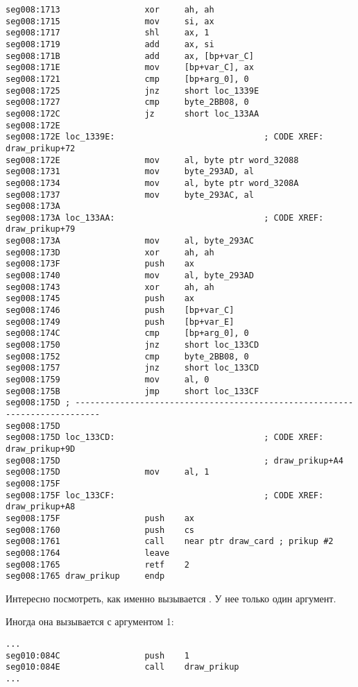 \begin{lstlisting}
seg008:1713                 xor     ah, ah
seg008:1715                 mov     si, ax
seg008:1717                 shl     ax, 1
seg008:1719                 add     ax, si
seg008:171B                 add     ax, [bp+var_C]
seg008:171E                 mov     [bp+var_C], ax
seg008:1721                 cmp     [bp+arg_0], 0
seg008:1725                 jnz     short loc_1339E
seg008:1727                 cmp     byte_2BB08, 0
seg008:172C                 jz      short loc_133AA
seg008:172E
seg008:172E loc_1339E:                              ; CODE XREF: draw_prikup+72
seg008:172E                 mov     al, byte ptr word_32088
seg008:1731                 mov     byte_293AD, al
seg008:1734                 mov     al, byte ptr word_3208A
seg008:1737                 mov     byte_293AC, al
seg008:173A
seg008:173A loc_133AA:                              ; CODE XREF: draw_prikup+79
seg008:173A                 mov     al, byte_293AC
seg008:173D                 xor     ah, ah
seg008:173F                 push    ax
seg008:1740                 mov     al, byte_293AD
seg008:1743                 xor     ah, ah
seg008:1745                 push    ax
seg008:1746                 push    [bp+var_C]
seg008:1749                 push    [bp+var_E]
seg008:174C                 cmp     [bp+arg_0], 0
seg008:1750                 jnz     short loc_133CD
seg008:1752                 cmp     byte_2BB08, 0
seg008:1757                 jnz     short loc_133CD
seg008:1759                 mov     al, 0
seg008:175B                 jmp     short loc_133CF
seg008:175D ; ---------------------------------------------------------------------------
seg008:175D
seg008:175D loc_133CD:                              ; CODE XREF: draw_prikup+9D
seg008:175D                                         ; draw_prikup+A4
seg008:175D                 mov     al, 1
seg008:175F
seg008:175F loc_133CF:                              ; CODE XREF: draw_prikup+A8
seg008:175F                 push    ax
seg008:1760                 push    cs
seg008:1761                 call    near ptr draw_card ; prikup #2
seg008:1764                 leave
seg008:1765                 retf    2
seg008:1765 draw_prikup     endp
\end{lstlisting}

Интересно посмотреть, как именно вызывается . У нее только один аргумент.

Иногда она вызывается с аргументом 1:

\begin{lstlisting}
...
seg010:084C                 push    1
seg010:084E                 call    draw_prikup
...
\end{lstlisting}

